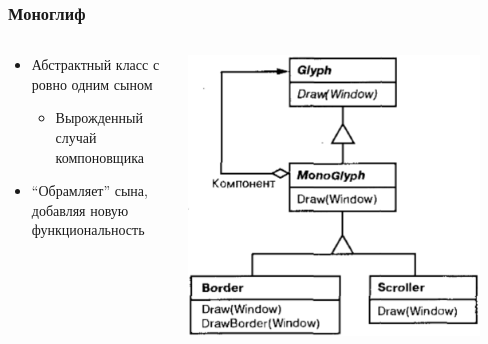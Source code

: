 \documentclass{../../slides-style}
\begin{document}
    \begin{frame}
        \frametitle{Моноглиф}
        \begin{columns}
            \begin{column}{0.6\textwidth}
                \begin{itemize}
                    \item Абстрактный класс с ровно одним сыном
                    \begin{itemize}
                        \item Вырожденный случай компоновщика
                    \end{itemize}
                    \item ``Обрамляет'' сына, добавляя новую функциональность
                \end{itemize}
            \end{column}
            \begin{column}{0.4\textwidth}
                \begin{center}
                    \includegraphics[width=0.9\textwidth]{monoglyph.png}
                \end{center}
            \end{column}
        \end{columns}
    \end{frame}
\end{document}
